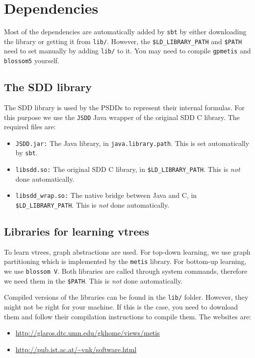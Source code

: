 \documentclass[a4paper,10pt]{article}
\begin{document}
\section{Dependencies}

Most of the dependencies are automatically added by {\tt sbt} by either downloading the library or getting it from {\tt lib/}. However, the {\tt \$LD\_LIBRARY\_PATH} and {\tt \$PATH} need to set manually by adding {\tt lib/} to it. You may need to compile {\tt gpmetis} and {\tt blossom5} yourself.

\subsection{The SDD library}
The SDD library is used by the PSDDs to represent their internal formulas. For this purpose we use the {\tt JSDD} Java wrapper of the original SDD C library. The required files are:
\begin{itemize}
 \item {\tt JSDD.jar:} The Java library, in {\tt java.library.path}. This is set automatically by {\tt sbt}.
 \item {\tt libsdd.so:} The original SDD C library, in {\tt \$LD\_LIBRARY\_PATH}.  This is \emph{not} done automatically.
 \item {\tt libsdd\_wrap.so:} The native bridge between Java and C, in \\ {\tt \$LD\_LIBRARY\_PATH}.  This is \emph{not} done automatically.
\end{itemize}

\subsection{Libraries for learning vtrees}
\label{sec:vtreelib}
To learn vtrees, graph abstractions are used. For top-down learning, we use graph partitioning which is implemented by the {\tt metis} library. For bottom-up learning, we use {\tt blossom V}. Both libraries are called through system commands, therefore we need them in the {\tt \$PATH}. This is \emph{not} done automatically.

Compiled versions of the libraries can be found in the {\tt lib/} folder. However, they might not be right for your machine. If this is the case, you need to download them and follow their compilation instructions to compile them. The websites are:

\begin{itemize}
 \item \url{http://glaros.dtc.umn.edu/gkhome/views/metis}
 \item \url{http://pub.ist.ac.at/~vnk/software.html}
\end{itemize}
\end{document}
